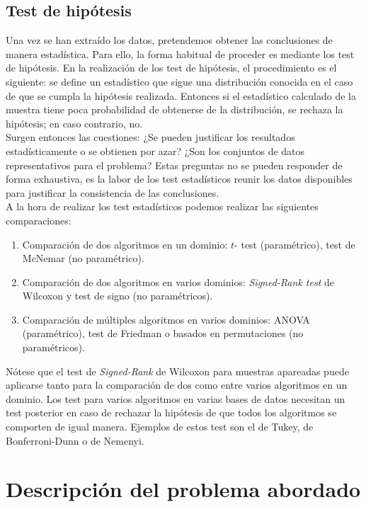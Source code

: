 \subsection*{Test de hipótesis}

	Una vez se han extraído los datos, pretendemos obtener
las conclusiones de manera estadística. Para ello, la 
forma habitual de proceder es mediante los test de hipótesis.
En la realización de los test de hipótesis, el 
procedimiento es el siguiente: se define un estadístico que 
sigue una distribución conocida en el caso de que se cumpla 
la hipótesis realizada. Entonces si el estadístico calculado 
de la muestra tiene poca probabilidad de obtenerse de la 
distribución, se rechaza la hipótesis; en caso contrario, no. 
\\
	Surgen entonces las cuestiones: ¿Se pueden justificar los 
resultados estadísticamente o se obtienen por azar? ¿Son los 
conjuntos de datos representativos para el problema? Estas 
preguntas no se pueden responder de forma exhaustiva, es la 
labor de los test estadísticos reunir los datos disponibles 
para justificar la consistencia de las conclusiones. \\
	A la hora de realizar los test estadísticos podemos 
realizar las siguientes comparaciones:
	\begin{enumerate}
	\item Comparación de dos algoritmos en un dominio: $t$-
		test (paramétrico), test de McNemar (no paramétrico).
	\item Comparación de dos algoritmos en varios dominios: 
		\textit{Signed-Rank test} de Wilcoxon y test de signo 
		(no paramétricos).
	\item Comparación de múltiples algoritmos en varios 
		dominios: ANOVA (paramétrico), test de Friedman o 
		basados en permutaciones (no paramétricos). 
	\end{enumerate}

	Nótese que el test de \textit{Signed-Rank} de Wilcoxon 
para muestras apareadas puede aplicarse tanto para la 
comparación de dos como entre varios algoritmos en un 
dominio. Los test para varios algoritmos en varias bases de 
datos necesitan un test posterior en caso de rechazar la 
hipótesis de que todos los algoritmos se comporten de igual 
manera. Ejemplos de estos test son el de Tukey, de 
Bonferroni-Dunn o de Nemenyi.

\section*{Descripción del problema abordado}

